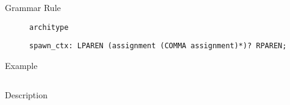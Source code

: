 \begin{description}
    \item[Grammar Rule] \texttt{architype}
          \begin{lstlisting}[style=gram]
spawn_ctx: LPAREN (assignment (COMMA assignment)*)? RPAREN;
\end{lstlisting}
    \item[Example] \texttt{}
          \begin{lstlisting}
    \end{lstlisting}

    \item[Description]
\end{description}
